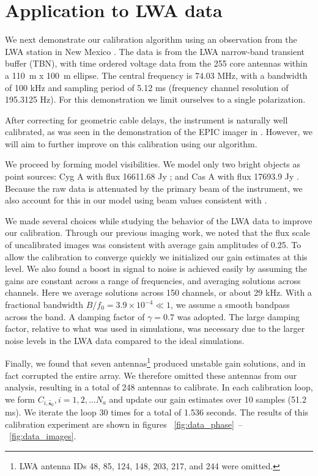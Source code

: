 \documentclass[a4paper,fleqn,usenatbib]{mnras}
\begin{document}
\section{Application to LWA data}\label{sec:data}
We next demonstrate our calibration algorithm using an observation from the LWA station in 
New Mexico \citep{ell13}. The data is from the LWA narrow-band transient buffer (TBN), with time ordered 
voltage data from the 255 core antennas within a 110~m x 100~m ellipse. 
The central frequency is 74.03 
MHz, with a bandwidth of 100 kHz and sampling period of 5.12 ms (frequency channel 
resolution of 195.3125 Hz). For this demonstration we limit ourselves to a single polarization.

After correcting for geometric cable delays, the instrument is naturally well calibrated, as was 
seen in the demonstration of the EPIC imager in \citealt{thy15c}. However, we will aim to 
further improve on this calibration using our algorithm.

We proceed by forming model visibilities. We model only two bright objects as point sources: 
Cyg A with flux 16611.68 Jy \citep{coh07}; and Cas A with flux 17693.9 Jy \citep{kas07}. 
Because the raw data is attenuated by the primary beam of the instrument, we also account for 
this in our model using beam values consistent with \cite{hic12}.

We made several choices while studying the behavior of the LWA data to improve our 
calibration. Through our previous imaging work, we noted that the flux scale of uncalibrated 
images was consistent with average gain amplitudes of 0.25. To allow the calibration to 
converge quickly we initialized our gain estimates at this level. 
We also found a boost in signal to noise is achieved easily by assuming the gains are
constant across a range of frequencies, and averaging solutions across channels.
Here we average solutions across 150 channels, or about 29 kHz. 
With a fractional bandwidth $B/f_0 = 3.9 \times 10^{-4} \ll 1$, we assume a smooth bandpass 
across the band. 
A damping factor of $\gamma = 0.7$ was adopted.
The large damping factor, relative to what was used in simulations, was necessary due to
the larger noise levels in the LWA data compared to the ideal simulations.

Finally, we found that seven antennas\footnote{LWA antenna IDs 48, 85, 124, 148, 203, 217, 
and 244 were omitted.} produced unstable gain solutions, and in fact corrupted the entire array. 
We therefore omitted these antennas from our analysis, resulting in a total of 248 antennas to 
calibrate. In each calibration loop, we form $C_{i,\hat{\boldsymbol{s}}_0}, i=1,2,\ldots N_a$ and 
update our gain estimates over 10 samples (51.2 ms). We iterate the loop 30 times for a 
total of 1.536 seconds. The results of this calibration experiment are shown in figures~
\ref{fig:data_phase}~--~\ref{fig:data_images}.
\end{document}
